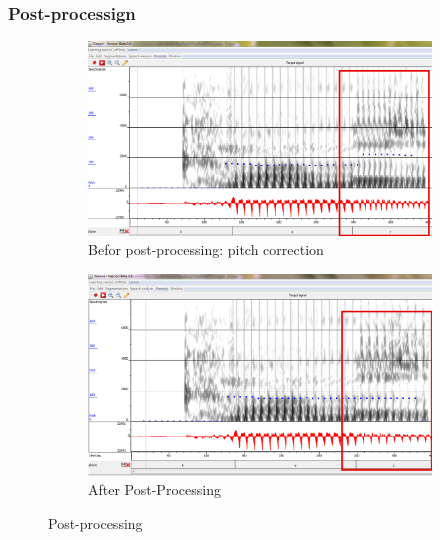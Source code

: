 \documentclass[11pt]{beamer}
\begin{document}
\begin{frame}
\frametitle{Post-processign}
\begin{figure}
\begin{subfigure}{.5\textwidth}
  \centering
  \includegraphics[width=0.9\linewidth]{images/target_befor_post_process1.PNG}
  \caption{Befor post-processing: pitch correction }
  \label{fig:sfig1}
\end{subfigure}%
\begin{subfigure}{.5\textwidth}
  \centering
  \includegraphics[width=0.9\linewidth]{images/case_target_2_changed.PNG}
  \caption{After Post-Processing}
  \label{fig:sfig2}
\end{subfigure}
\caption{Post-processing}
\label{fig:fig}
\end{figure}
\end{frame}



	
	
	
\end{document}
